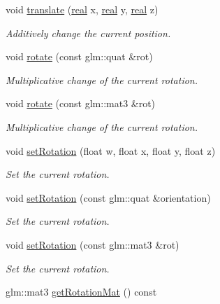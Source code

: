 \begin{DoxyCompactItemize}
void \mbox{\hyperlink{classr3_1_1_transform3_d_aab83077fb0b382391493aa59bdd2ce13}{translate}} (\mbox{\hyperlink{namespacer3_ab2016b3e3f743fb735afce242f0dc1eb}{real}} x, \mbox{\hyperlink{namespacer3_ab2016b3e3f743fb735afce242f0dc1eb}{real}} y, \mbox{\hyperlink{namespacer3_ab2016b3e3f743fb735afce242f0dc1eb}{real}} z)
\begin{DoxyCompactList}\small\item\em Additively change the current position. \end{DoxyCompactList}\item 
void \mbox{\hyperlink{classr3_1_1_transform3_d_aaf633209948d35ca4b90422614a84478}{rotate}} (const glm\+::quat \&rot)
\begin{DoxyCompactList}\small\item\em Multiplicative change of the current rotation. \end{DoxyCompactList}\item 
void \mbox{\hyperlink{classr3_1_1_transform3_d_a802314a0dee26e4a5fb96666cd39741c}{rotate}} (const glm\+::mat3 \&rot)
\begin{DoxyCompactList}\small\item\em Multiplicative change of the current rotation. \end{DoxyCompactList}\item 
void \mbox{\hyperlink{classr3_1_1_transform3_d_a78c34c186d255ad6dcd0adf7ce199c4e}{set\+Rotation}} (float w, float x, float y, float z)
\begin{DoxyCompactList}\small\item\em Set the current rotation. \end{DoxyCompactList}\item 
void \mbox{\hyperlink{classr3_1_1_transform3_d_af539b9a5a73f5196515f9a55ee73be4d}{set\+Rotation}} (const glm\+::quat \&orientation)
\begin{DoxyCompactList}\small\item\em Set the current rotation. \end{DoxyCompactList}\item 
void \mbox{\hyperlink{classr3_1_1_transform3_d_acaab6048f44805ef28fdae452f0c4853}{set\+Rotation}} (const glm\+::mat3 \&rot)
\begin{DoxyCompactList}\small\item\em Set the current rotation. \end{DoxyCompactList}\item 
glm\+::mat3 \mbox{\hyperlink{classr3_1_1_transform3_d_ac9c80563cfca63791987f04639cff411}{get\+Rotation\+Mat}} () const

\end{DoxyCompactItemize}
